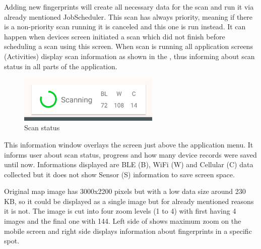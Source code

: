 Adding new fingerprints will create all necessary data for the scan and run it via already mentioned JobScheduler. This scan has always priority, meaning if there is a non-priority scan running it is canceled and this one is run instead. It can happen when devices screen initiated a scan which did not finish before scheduling a scan using this screen. When scan is running all application screens (Activities) display scan information as shown in the , thus informing about scan status in all parts of the application.

\begin{figure}[H]
	\begin{centering}
		\includegraphics[width=0.6\textwidth]{img/scan_status}
		\par\end{centering}
	\caption{Scan status}
	\label{fig05c05}
\end{figure}

This information window overlays the screen just above the application menu. It informs user about scan status, progress and how many device records were saved until now. Informations displayed are BLE (B), WiFi (W) and Cellular (C) data collected but it does not show Sensor (S) information to save screen space.

Original map image has 3000x2200 pixels but with a low data size around 230 KB, so it could be displayed as a single image but for already mentioned reasons it is not. The image is cut into four zoom levels (1 to 4) with first having 4 images and the final one with 144. Left side of  shows maximum zoom on the mobile screen and right side displays information about fingerprints in a specific spot.

